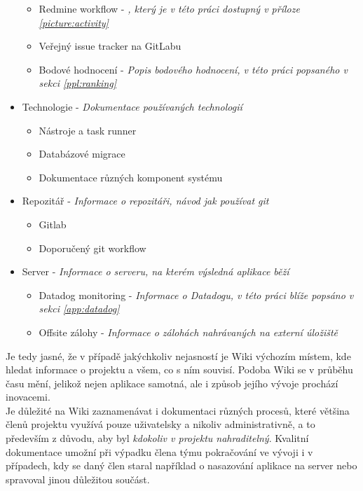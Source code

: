 \begin{itemize}
	\begin{itemize}
		\item Redmine workflow - \emph{, který je v této práci dostupný v příloze \ref{picture:activity}}
		\item Veřejný issue tracker na GitLabu
		\item Bodové hodnocení - \emph{Popis bodového hodnocení, v této práci popsaného v sekci \ref{ppl:ranking}}
	\end{itemize}
	\item Technologie - \emph{Dokumentace používaných technologií}
	\begin{itemize}
		\item Nástroje a task runner
		\item Databázové migrace
		\item Dokumentace různých komponent systému
	\end{itemize}
	\item Repozitář - \emph{Informace o repozitáři, návod jak používat git}
	\begin{itemize}
		\item Gitlab
		\item Doporučený git workflow
	\end{itemize}
	\item Server - \emph{Informace o serveru, na kterém výsledná aplikace běží}
	\begin{itemize}
		\item Datadog monitoring - \emph{Informace o Datadogu, v této práci blíže popsáno v sekci \ref{app:datadog}}
		\item Offsite zálohy - \emph{Informace o zálohách nahrávaných na externí úložiště}
	\end{itemize}
\end{itemize}

Je tedy jasné, že v případě jakýchkoliv nejasností je Wiki výchozím místem, kde hledat informace o projektu a všem, co s ním souvisí. Podoba Wiki se v průběhu času mění, jelikož nejen aplikace samotná, ale i způsob jejího vývoje prochází inovacemi.\\
Je důležité na Wiki zaznamenávat i dokumentaci různých procesů, které většina členů projektu využívá pouze uživatelsky a nikoliv administrativně, a to především z důvodu, aby byl \emph{kdokoliv v projektu nahraditelný}. Kvalitní dokumentace umožní při výpadku člena týmu pokračování ve vývoji i v případech, kdy se daný člen staral například o nasazování aplikace na server nebo spravoval jinou důležitou součást.

